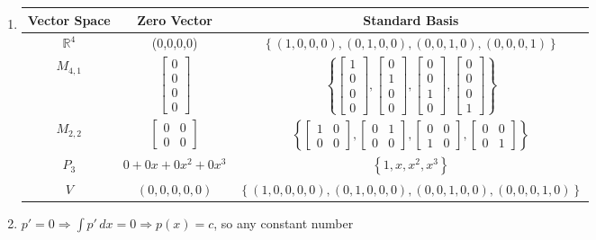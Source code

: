 \documentclass[12pt]{article}
\begin{document}
\begin{enumerate}
  \item \begin{tabular}{c | c | c} Vector Space & Zero Vector & Standard Basis \\\hline $\mathbb{R}^4$ & (0,0,0,0) & $\left\{ (1,0,0,0),(0,1,0,0),(0,0,1,0),(0,0,0,1) \right\}$\\ $M_{4,1}$ & $\begin{bmatrix} 0\\0\\0\\0\end{bmatrix}$ & $\left\{ \begin{bmatrix} 1\\0\\0\\0\end{bmatrix},\begin{bmatrix}0\\1\\0\\0\end{bmatrix},\begin{bmatrix}0\\0\\1\\0\end{bmatrix},\begin{bmatrix}0\\0\\0\\1\end{bmatrix} \right\}$\\ $M_{2,2}$ & $\begin{bmatrix} 0 & 0\\0 & 0\end{bmatrix}$ & $\left\{ \begin{bmatrix} 1 & 0\\0 & 0\end{bmatrix},\begin{bmatrix} 0 & 1\\ 0 & 0\end{bmatrix},\begin{bmatrix} 0 & 0\\ 1 & 0\end{bmatrix},\begin{bmatrix} 0 & 0\\ 0 & 1\end{bmatrix} \right\}$ \\ $P_3$ & $0+0x+0x^2+0x^3$ & $\left\{ 1,x,x^2,x^3 \right\}$ \\ $V$ & $(0,0,0,0,0)$ & $\left\{ (1,0,0,0,0),(0,1,0,0,0),(0,0,1,0,0),(0,0,0,1,0) \right\}$  \end{tabular}

    \setcounter{enumi}{56}

  \item $p'=0\Rightarrow\int p'\,dx=0\Rightarrow p(x)=c$, so any constant number

\end{enumerate}
\end{document}
